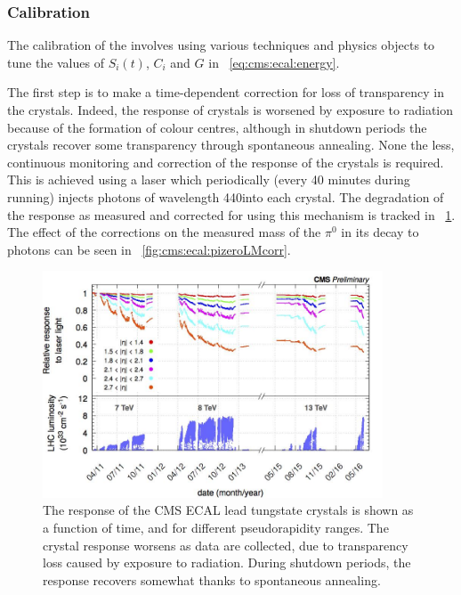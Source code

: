 \subsubsection{Calibration}
\label{sec:cms:ecal:calibration}

The calibration of the \ECAL involves using various techniques and physics objects to tune the values of $S_{i}(t)$, $C_{i}$ and $G$ in \Eq~\ref{eq:cms:ecal:energy}. 

The first step is to make a time-dependent correction for loss of transparency in the crystals. Indeed, the response of \ECAL crystals is worsened by exposure to radiation because of the formation of colour centres, although in shutdown periods the crystals recover some transparency through spontaneous annealing. None the less, continuous monitoring and correction of the response of the crystals is required. This is achieved using a laser which periodically (every 40 minutes during running) injects photons of wavelength 440\nm into each crystal. The degradation of the response as measured and corrected for using this mechanism is tracked in \Fig~\ref{fig:cms:ecal:lasercorrections}. The effect of the corrections on the measured mass of the $\pi^0$ in its decay to photons can be seen in  \Fig~\ref{fig:cms:ecal:pizeroLMcorr}.

\begin{figure}[h]
\centering
\includegraphics[width=0.9\textwidth]{detectorFigures/EcalLaserCorrections.jpg}
\caption{The response of the CMS ECAL lead tungstate crystals is shown as a function of time, and for different pseudorapidity ranges. The crystal response worsens as data are collected, due to transparency loss caused by exposure to radiation. During shutdown periods, the response recovers somewhat thanks to spontaneous annealing. \cite{CMSECALPublic}}
\label{fig:cms:ecal:lasercorrections}
\end{figure}

